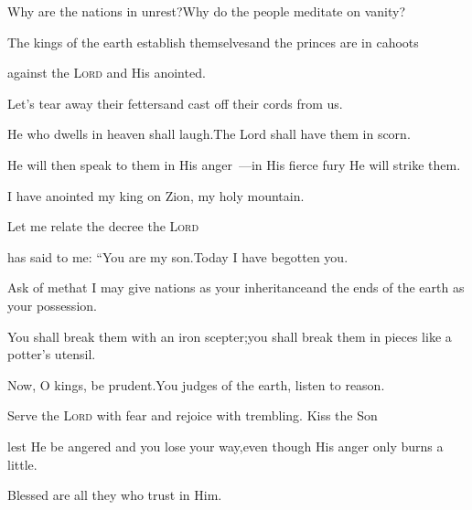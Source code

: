 
\begin{inparaenum}
  \pb {} Why are the nations in unrest?\pa Why do the people meditate on vanity?%
  
  \pb {} The kings of the earth establish themselves\pa and the princes are in cahoots%
  
  \pc against the \textsc{Lord} and His anointed.%
  
  \pb {} Let's tear away their fetters\pa and cast off their cords from us.%
  
  \pc {} He who dwells in heaven shall laugh.\pa The Lord%
  shall have them in scorn.%
  
  \pb {} He will then speak to them in His anger~---\pa in His fierce fury%
  He will strike them.%
  
  \pb {} I have anointed my king%
  \pa on Zion, my holy mountain.%
  
  \pc {} Let me relate the decree%
  the \textsc{Lord}%
  
  \pc has said to me: ``You are my son.\pa Today I have begotten you.%
  
  \pb {} Ask of me\pa that I may give nations as your inheritance\pa and the ends of the earth as your possession.%
  
  \pb {} You shall break them with an iron scepter;\pa you shall break them in pieces like a potter's utensil.%
  
  \pc {} Now, O kings, be prudent.\pa You judges of the earth, listen to reason.%
  
  \pc {} Serve the \textsc{Lord} with fear%
  \pa and rejoice with trembling.  Kiss the Son%
  
  \pc lest He be angered and you lose your way,\pa even though His anger only burns a little.%
  
  \pc Blessed are all they who trust in Him.%
\end{inparaenum}
